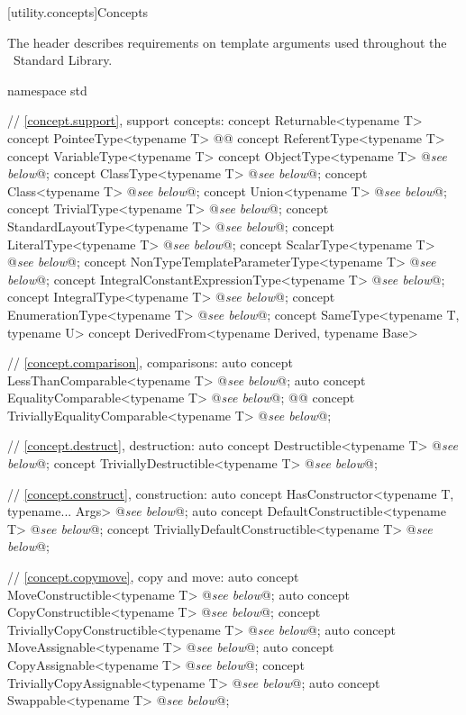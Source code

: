 \documentclass[american,twoside]{book}
\begin{document}
\noindent{}

\color{addclr}
[utility.concepts]{Concepts}

\pnum The  header describes requirements on template
arguments used throughout the \Cpp\ Standard Library.

\begin{codeblock}
namespace std {
  // \ref{concept.support}, support concepts:
  concept Returnable<typename T> { }
  concept PointeeType<typename T> { }
  @@
  concept ReferentType<typename T> { }
  concept VariableType<typename T> { }
  concept ObjectType<typename T> @\textit{see below}@;
  concept ClassType<typename T> @\textit{see below}@;
  concept Class<typename T> @\textit{see below}@;
  concept Union<typename T> @\textit{see below}@;
  concept TrivialType<typename T> @\textit{see below}@;
  concept StandardLayoutType<typename T> @\textit{see below}@;
  concept LiteralType<typename T> @\textit{see below}@;
  concept ScalarType<typename T> @\textit{see below}@;
  concept NonTypeTemplateParameterType<typename T> @\textit{see below}@;
  concept IntegralConstantExpressionType<typename T> @\textit{see below}@;
  concept IntegralType<typename T> @\textit{see below}@;
  concept EnumerationType<typename T> @\textit{see below}@;
  concept SameType<typename T, typename U> {  }
  concept DerivedFrom<typename Derived, typename Base> { }

  // \ref{concept.comparison}, comparisons:
  auto concept LessThanComparable<typename T> @\textit{see below}@;
  auto concept EqualityComparable<typename T> @\textit{see below}@;
  @@ concept TriviallyEqualityComparable<typename T> @\textit{see below}@;

  // \ref{concept.destruct}, destruction:
  auto concept Destructible<typename T> @\textit{see below}@;
  concept TriviallyDestructible<typename T> @\textit{see below}@;

  // \ref{concept.construct}, construction:
  auto concept HasConstructor<typename T, typename... Args> @\textit{see below}@;
  auto concept DefaultConstructible<typename T> @\textit{see below}@;
  concept TriviallyDefaultConstructible<typename T> @\textit{see below}@;

  // \ref{concept.copymove}, copy and move:
  auto concept MoveConstructible<typename T> @\textit{see below}@;
  auto concept CopyConstructible<typename T> @\textit{see below}@;
  concept TriviallyCopyConstructible<typename T> @\textit{see below}@;
  auto concept MoveAssignable<typename T> @\textit{see below}@;
  auto concept CopyAssignable<typename T> @\textit{see below}@;
  concept TriviallyCopyAssignable<typename T> @\textit{see below}@;
  auto concept Swappable<typename T> @\textit{see below}@;

}
\end{codeblock}
\end{document}

